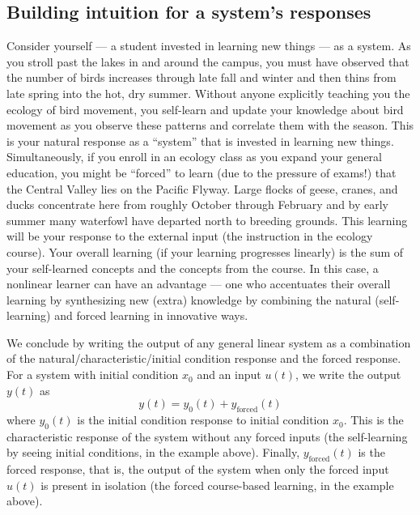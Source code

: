 \subsection{Building intuition for a system's responses}
Consider yourself --- a student invested in learning new things --- as a system. As you stroll past the lakes in and around the campus, you must have observed that the number of birds increases through late fall and winter and then thins from late spring into the hot, dry summer. Without anyone explicitly teaching you the ecology of bird movement, you self-learn and update your knowledge about bird movement as you observe these patterns and correlate them with the season. This is your natural response as a ``system'' that is invested in learning new things. Simultaneously, if you enroll in an ecology class as you expand your general education, you might be ``forced'' to learn (due to the pressure of exams!) that the Central Valley lies on the Pacific Flyway. Large flocks of geese, cranes, and ducks concentrate here from roughly October through February and by early summer many waterfowl have departed north to breeding grounds. This learning will be your response to the external input (the instruction in the ecology course). Your overall learning (if your learning progresses linearly) is the sum of your self-learned concepts and the concepts from the course. In this case, a nonlinear learner can have an advantage --- one who accentuates their overall learning by synthesizing new (extra) knowledge by combining the natural (self-learning) and forced learning in innovative ways.


We conclude by writing the output of any general linear system as a combination of the natural/characteristic/initial condition response and the forced response. For a system with initial condition $x_0$ and an input $u(t)$, we write the output $y(t)$ as
\[
y(t) = y_{0}(t) + y_{\text{forced}}(t)
\]
where $y_0(t)$ is the initial condition response to initial condition $x_0$. This is the characteristic response of the system without any forced inputs (the self-learning by seeing initial conditions, in the example above). Finally, $y_{\text{forced}}(t)$ is the forced response, that is, the output of the system when only the forced input $u(t)$ is present in isolation (the forced course-based learning, in the example above). 
